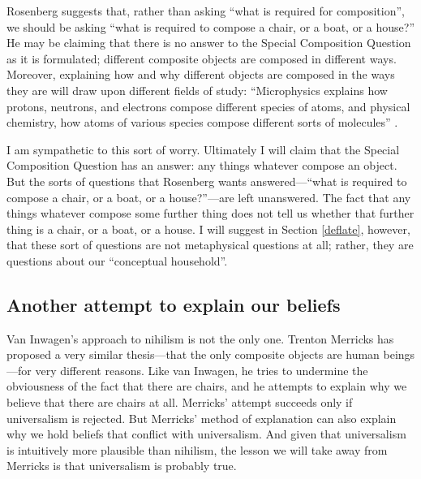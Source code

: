 \documentclass[11pt]{article}
\begin{document}
\begin{spacing}{1.5}
Rosenberg suggests that, rather than asking ``what is required for
composition'', we should be asking ``what is required to compose a
chair, or a boat, or a house?''  He may be claiming that there is no
answer to the Special Composition Question as it is formulated;
different composite objects are composed in different ways.  Moreover,
explaining how and why different objects are composed in the ways they
are will draw upon different fields of study: ``Microphysics explains
how protons, neutrons, and electrons compose different species of
atoms, and physical chemistry, how atoms of various species compose
different sorts of molecules'' \citep[706]{rosenberg1993}.

I am sympathetic to this sort of worry.  Ultimately I will claim that
the Special Composition Question has an answer: any things whatever
compose an object.  But the sorts of questions that Rosenberg wants
answered---``what is required to compose a chair, or a boat, or a
house?''---are left unanswered.  The fact that any things whatever
compose some further thing does not tell us whether that further thing
is a chair, or a boat, or a house.  I will suggest in Section
\ref{deflate}, however, that these sort of questions are not
metaphysical questions at all; rather, they are questions about our
``conceptual household''.

\subsection{Another attempt to explain our beliefs}
\label{explain-merricks}
Van Inwagen's approach to nihilism is not the only one.  Trenton
Merricks has proposed a very similar thesis---that the only composite
objects are human beings---for very different reasons.  Like van
Inwagen, he tries to undermine the obviousness of the fact that there
are chairs, and he attempts to explain why we believe that there are
chairs at all.  Merricks' attempt succeeds only if universalism is
rejected.  But Merricks' method of explanation can also explain why we
hold beliefs that conflict with universalism.  And given that
universalism is intuitively more plausible than nihilism, the lesson
we will take away from Merricks is that universalism is probably true.

\ifstandalone
\end{spacing}


\fi
\end{document}
